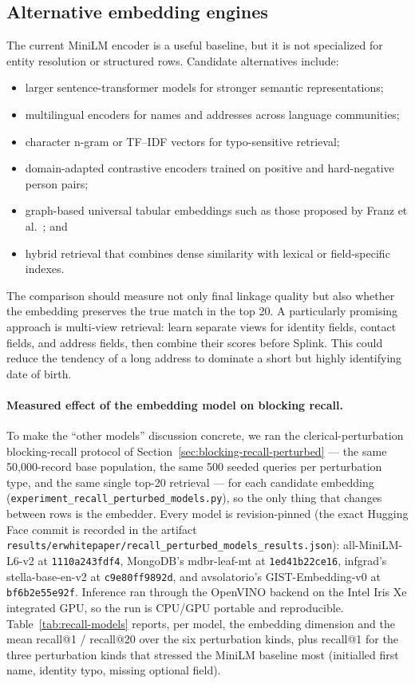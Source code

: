\documentclass[11pt]{article}
\begin{document}
\subsection{Alternative embedding engines}
The current MiniLM encoder is a useful baseline, but it is not specialized for entity resolution or structured rows. Candidate alternatives include:
\begin{itemize}[leftmargin=*]
  \item larger sentence-transformer models for stronger semantic representations;
  \item multilingual encoders for names and addresses across language communities;
  \item character n-gram or TF--IDF vectors for typo-sensitive retrieval;
  \item domain-adapted contrastive encoders trained on positive and hard-negative person pairs;
  \item graph-based universal tabular embeddings such as those proposed by Franz et al.~\cite{franz2025}; and
  \item hybrid retrieval that combines dense similarity with lexical or field-specific indexes.
\end{itemize}

The comparison should measure not only final linkage quality but also whether the embedding preserves the true match in the top 20. A particularly promising approach is multi-view retrieval: learn separate views for identity fields, contact fields, and address fields, then combine their scores before Splink. This could reduce the tendency of a long address to dominate a short but highly identifying date of birth.

\paragraph{Measured effect of the embedding model on blocking recall.}
To make the ``other models'' discussion concrete, we ran the clerical-perturbation blocking-recall protocol of Section~\ref{sec:blocking-recall-perturbed} --- the same 50{,}000-record base population, the same 500 seeded queries per perturbation type, and the same single top-20 retrieval --- for each candidate embedding (\texttt{experiment\_recall\_perturbed\_models.py}), so the only thing that changes between rows is the embedder. Every model is revision-pinned (the exact Hugging Face commit is recorded in the artifact \texttt{results/erwhitepaper/recall\_perturbed\_models\_results.json}): all-MiniLM-L6-v2 at \texttt{1110a243fdf4}, MongoDB's mdbr-leaf-mt at \texttt{1ed41b22ce16}, infgrad's stella-base-en-v2 at \texttt{c9e80ff9892d}, and avsolatorio's GIST-Embedding-v0 at \texttt{bf6b2e55e92f}. Inference ran through the OpenVINO backend on the Intel Iris Xe integrated GPU, so the run is CPU/GPU portable and reproducible. Table~\ref{tab:recall-models} reports, per model, the embedding dimension and the mean recall@1 / recall@20 over the six perturbation kinds, plus recall@1 for the three perturbation kinds that stressed the MiniLM baseline most (initialled first name, identity typo, missing optional field).
\end{document}
